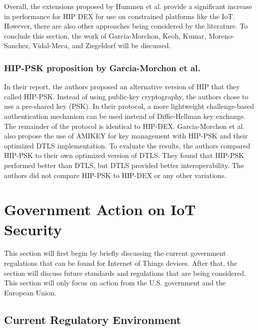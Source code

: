 \documentclass[letterpaper, 12pt]{article}
\begin{document}
\begin{flushleft}
Overall, the extensions proposed by Hummen et al. provide a significant increase in performance for HIP DEX for use on constrained platforms like the 
IoT. However, there are also other approaches being considered by the literature. To conclude this section, the work of Garcia-Morchon, Keoh, Kumar,
Moreno-Sanchez, Vidal-Meca, and Ziegeldorf will be discussed. 

\subsubsection*{HIP-PSK proposition by Garcia-Morchon et al.}
In their report, the authors proposed an alternative version of HIP that they called HIP-PSK. Instead of using public-key cryptography, the authors chose
to use a pre-shared key (PSK). In their protocol, a more lightweight challenge-based authentication mechanism can be used instead of Diffie-Hellman key
exchange. The remainder of the protocol is identical to HIP-DEX. Garcia-Morchon et al. also propose the use of AMIKEY for key management with HIP-PSK
and their optimized DTLS implementation. To evaluate the results, the authors compared HIP-PSK to their own optimized version of DTLS. They found that 
HIP-PSK performed better than DTLS, but DTLS provided better interoperability. The authors did not compare HIP-PSK to HIP-DEX or any other variations. 

\section*{Government Action on IoT Security}

This section will first begin by briefly discussing the current government regulations that can be found for Internet of Things devices. After that,
the section will discuss future standards and regulations that are being considered. This section will only focus on action from the U.S. government and the European Union.

\subsection*{Current Regulatory Environment}


\end{flushleft}
\end{document}
